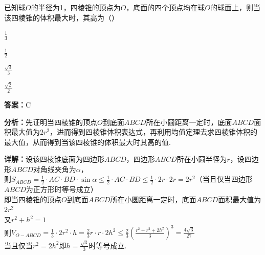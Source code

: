 \begin{question}[points=5]
已知球$O$的半径为1，四棱锥的顶点为$O$，底面的四个顶点均在球$O$的球面上，则当该四棱锥的体积最大时，其高为（\qquad）
\begin{choices}
  \item $\frac{1}{3}$
  \item $\frac{1}{2}$
  \item $\frac{\sqrt{3}}{3}$
  \item $\frac{\sqrt{2}}{2}$
\end{choices}
\begin{solution}
\textbf{答案：}C

\textbf{分析：}先证明当四棱锥的顶点$O$到底面$ABCD$所在小圆距离一定时，底面$ABCD$面积最大值为$2r^2$，进而得到四棱锥体积表达式，再利用均值定理去求四棱锥体积的最大值，从而得到当该四棱锥的体积最大时其高的值.

\textbf{详解：}设该四棱锥底面为四边形$ABCD$，四边形$ABCD$所在小圆半径为$r$，设四边形$ABCD$对角线夹角为$\alpha$，\\则$S_{ABCD} = \frac{1}{2}\cdot AC\cdot BD\cdot\sin\alpha \leq \frac{1}{2}\cdot AC\cdot BD \leq \frac{1}{2}\cdot 2r\cdot 2r = 2r^2$（当且仅当四边形$ABCD$为正方形时等号成立）\\即当四棱锥的顶点$O$到底面$ABCD$所在小圆距离一定时，底面$ABCD$面积最大值为$2r^2$\\又$r^2 + h^2 = 1$\\则$V_{O-ABCD} = \frac{1}{3}\cdot 2r^2\cdot h = \frac{2}{3}r\cdot r\cdot 2h^2 \leq \frac{2}{3}\left(\frac{r^2 + r^2 + 2h^2}{3}\right)^3 = \frac{4\sqrt{3}}{27}$\\当且仅当$r^2 = 2h^2$即$h = \frac{\sqrt{3}}{3}$时等号成立.
\end{solution}
\end{question}

